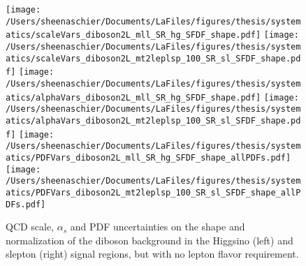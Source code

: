  \begin{figure}
  \centering
  \texttt{[image: /Users/sheenaschier/Documents/LaFiles/figures/thesis/systematics/scaleVars\_diboson2L\_mll\_SR\_hg\_SFDF\_shape.pdf]}
  \texttt{[image: /Users/sheenaschier/Documents/LaFiles/figures/thesis/systematics/scaleVars\_diboson2L\_mt2leplsp\_100\_SR\_sl\_SFDF\_shape.pdf]}
 \texttt{[image: /Users/sheenaschier/Documents/LaFiles/figures/thesis/systematics/alphaVars\_diboson2L\_mll\_SR\_hg\_SFDF\_shape.pdf]}
 \texttt{[image: /Users/sheenaschier/Documents/LaFiles/figures/thesis/systematics/alphaVars\_diboson2L\_mt2leplsp\_100\_SR\_sl\_SFDF\_shape.pdf]}
  \texttt{[image: /Users/sheenaschier/Documents/LaFiles/figures/thesis/systematics/PDFVars\_diboson2L\_mll\_SR\_hg\_SFDF\_shape\_allPDFs.pdf]}
  \texttt{[image: /Users/sheenaschier/Documents/LaFiles/figures/thesis/systematics/PDFVars\_diboson2L\_mt2leplsp\_100\_SR\_sl\_SFDF\_shape\_allPDFs.pdf]}
 \caption{QCD scale, $\alpha_{s}$ and PDF uncertainties on the shape and normalization of the diboson background in the Higgsino (left) and slepton (right) signal regions, but with no lepton flavor requirement.}
\label{fig:theoryUncsVV}
 \end{figure}
 
